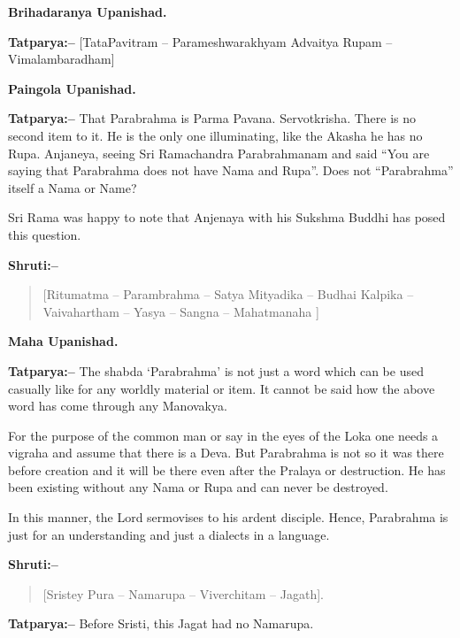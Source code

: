 \begin{flushright}
\textbf{Brihadaranya Upanishad.}
\end{flushright}

\textbf{Tatparya:–} [TataPavitram – Parameshwarakhyam Advaitya Rupam – Vimalambaradham]

\begin{flushright}
\textbf{Paingola Upanishad.}
\end{flushright}

\textbf{Tatparya:–} That Parabrahma is Parma Pavana. Servotkrisha. There is no second item to it. He is the only one illuminating, like the Akasha he has no Rupa. Anjaneya, seeing Sri Ramachandra Parabrahmanam and said “You are saying that Parabrahma does not have Nama and Rupa”. Does not “Parabrahma” itself a Nama or Name?

Sri Rama was happy to note that Anjenaya with his Sukshma Buddhi has posed this question.

\textbf{Shruti:–}

\begin{verse}
[Ritumatma – Parambrahma – Satya Mityadika – Budhai  Kalpika – Vaivahartham – Yasya – Sangna – Mahatmanaha ]
\end{verse}

\begin{flushright}
\textbf{Maha Upanishad.}
\end{flushright}

\textbf{Tatparya:–} The shabda ‘Parabrahma’ is not just a word which can be used casually like for any worldly material or item. It cannot be said how the above word has come through any Manovakya.

For the purpose of the common man or say in the eyes of the Loka one needs a vigraha and assume that there is a Deva. But Parabrahma is not so it was there before creation and it will be there even after the Pralaya or destruction. He has been existing without any Nama or Rupa and can never be destroyed.

In this manner, the Lord sermovises to his ardent disciple. Hence, Parabrahma is just for an understanding and just a dialects in a language.

\textbf{Shruti:–}

\begin{verse}
[Sristey Pura – Namarupa – Viverchitam – Jagath].
\end{verse}

\textbf{Tatparya:–} Before Sristi, this Jagat had no Namarupa.

